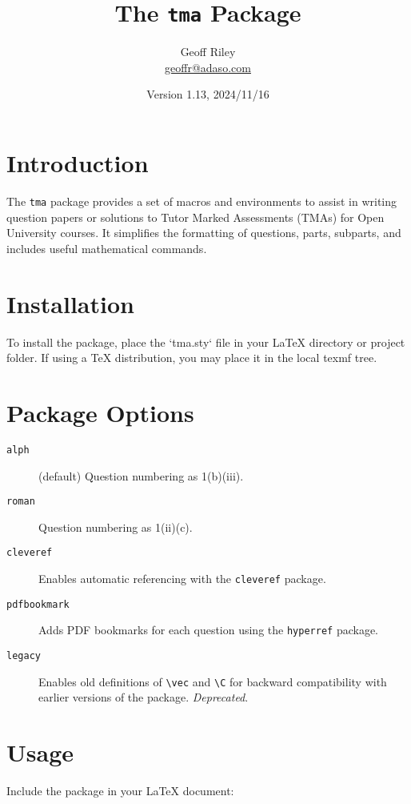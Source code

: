 \documentclass[twoside]{article}
\title{The \texttt{tma} Package}
\author{Geoff Riley \\ \href{mailto:geoffr@adaso.com.com}{geoffr@adaso.com}}
\date{Version 1.13, 2024/11/16}
\begin{document}
	
	\maketitle
	
	\tableofcontents
	
	\section{Introduction}
	
	The \texttt{tma} package provides a set of macros and environments to assist in writing question papers or solutions to Tutor Marked Assessments (TMAs) for Open University courses. It simplifies the formatting of questions, parts, subparts, and includes useful mathematical commands.
	
	\section{Installation}
	
	To install the package, place the `tma.sty` file in your LaTeX directory or project folder. If using a TeX distribution, you may place it in the local texmf tree.
	
	\section{Package Options}
	
	\begin{description}
		\item[\texttt{alph}] (default) Question numbering as 1(b)(iii).
		\item[\texttt{roman}] Question numbering as 1(ii)(c).
		\item[\texttt{cleveref}] Enables automatic referencing with the \texttt{cleveref} package.
		\item[\texttt{pdfbookmark}] Adds PDF bookmarks for each question using the \texttt{hyperref} package.
		\item[\texttt{legacy}] Enables old definitions of \verb|\vec| and \verb|\C| for backward compatibility with earlier versions of the package. \emph{Deprecated}.
	\end{description}
	
	\section{Usage}
	
	Include the package in your LaTeX document:
	
\end{document}
